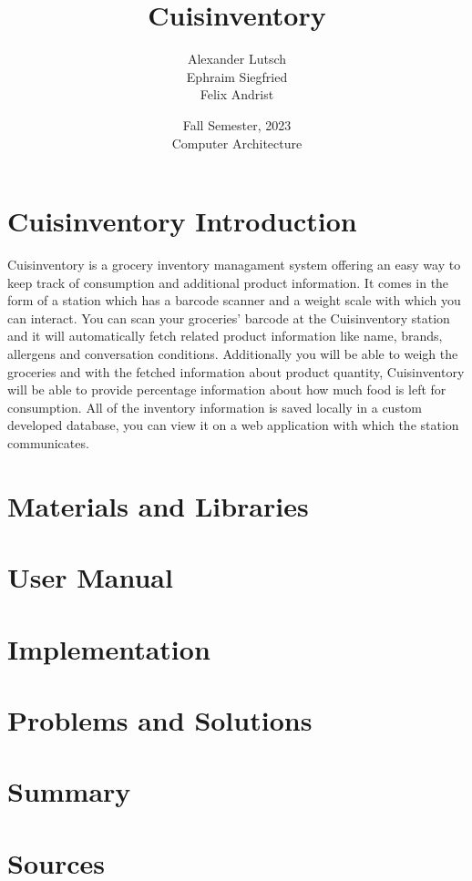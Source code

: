 \documentclass{article}
\author{Alexander Lutsch\\Ephraim Siegfried\\Felix Andrist}
\title{ \Huge Cuisinventory }
\date{Fall Semester, 2023 \\ Computer Architecture}
\begin{document}
\maketitle

\section{Cuisinventory Introduction}
Cuisinventory is a grocery inventory managament system offering an easy way to keep track of consumption and additional product information.
It comes in the form of a station which has a barcode scanner and a weight scale with which you can interact. You can scan your groceries' barcode at the Cuisinventory station and
it will automatically fetch related product information like name, brands, allergens and conversation conditions. Additionally you will be able to weigh the groceries and with the fetched information about product quantity,
Cuisinventory will be able to provide percentage information about how much food is left for consumption. All of the inventory information is saved locally in a custom developed database, you can view it on a web application with which the station communicates.

\section{Materials and Libraries}

\section{User Manual}

\section{Implementation}

\section{Problems and Solutions}

\section{Summary}

\section{Sources}





\end{document}
